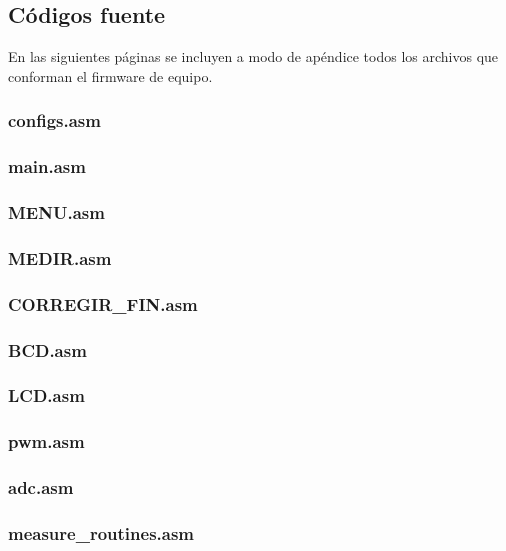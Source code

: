 \subsection{Códigos fuente}
En las siguientes páginas se incluyen a modo de apéndice todos los archivos que conforman el firmware de equipo.

\subsubsection{configs.asm}
    

\subsubsection{main.asm}
    

\subsubsection{MENU.asm}
    

\subsubsection{MEDIR.asm}
    

\subsubsection{CORREGIR\_FIN.asm}
    

\subsubsection{BCD.asm}
    

\subsubsection{LCD.asm}
    

\subsubsection{pwm.asm}
    

\subsubsection{adc.asm}
    

\subsubsection{measure\_routines.asm}
    
